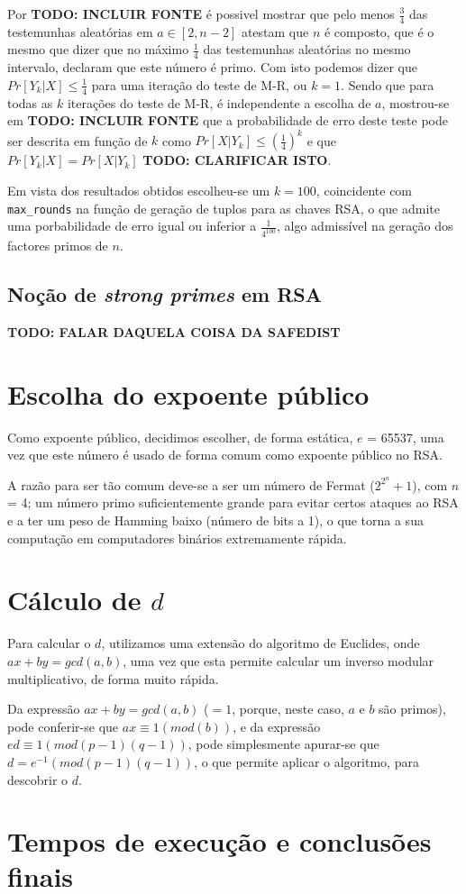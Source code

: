 \documentclass[dvipsnames]{article}
\begin{document}

\noindent Por \textbf{TODO: INCLUIR FONTE} é possivel mostrar que pelo menos $\frac{3}{4}$ das testemunhas aleatórias em $a \in [2,n-2]$ atestam que $n$ é composto, que é o mesmo que dizer que no máximo $\frac{1}{4}$ das testemunhas aleatórias no mesmo intervalo, declaram que este número é primo. Com isto podemos dizer que $Pr[Y_k|X] \leq \frac{1}{4}$ para uma iteração do teste de M-R, ou $k=1$. Sendo que para todas as $k$ iterações do teste de M-R, é independente a escolha de $a$, mostrou-se em \textbf{TODO: INCLUIR FONTE} que a probabilidade de erro deste teste pode ser descrita em função de $k$ como $Pr[X|Y_k] \leq (\frac{1}{4})^k$ e que $Pr[Y_k|X] = Pr[X|Y_k]$ \textbf{TODO: CLARIFICAR ISTO}.

\vskip 0.4cm

\noindent Em vista dos resultados obtidos escolheu-se um $k=100$, coincidente com \texttt{max\_rounds} na função de geração de tuplos para as chaves RSA, o que admite uma porbabilidade de erro igual ou inferior a $\frac{1}{4^{100}}$, algo admissível na geração dos factores primos de $n$.

\subsection{Noção de \textit{strong primes} em RSA}

\textbf{TODO: FALAR DAQUELA COISA DA SAFEDIST}

\section{Escolha do expoente público}
Como expoente público, decidimos escolher, de forma estática, $e$ =  65537, uma vez que este número é usado de forma comum como expoente público no RSA.

\vskip 0.4cm

\noindent A razão para ser tão comum deve-se a ser um número de Fermat (${2^{2^n}}+1$), com $n$ = 4; um número primo suficientemente grande para evitar certos ataques ao RSA e a ter um peso de Hamming baixo (número de bits a 1), o que torna a sua computação em computadores binários extremamente rápida.

\section{Cálculo de $d$}
Para calcular o $d$, utilizamos uma extensão do algoritmo de Euclides, onde $ax + by = gcd(a,b)$, uma vez que esta permite calcular um inverso modular multiplicativo, de forma muito rápida.

\vskip 0.4cm

\noindent Da expressão $ax + by = gcd(a,b)$ ($=1$, porque, neste caso, $a$ e $b$ são primos), pode conferir-se que $ax \equiv 1 (mod (b))$, e da expressão $ed \equiv 1 (mod (p-1)(q-1))$, pode simplesmente apurar-se que $d = e^{-1} (mod (p-1)(q-1))$, o que permite aplicar o algoritmo, para descobrir o $d$.

\section{Tempos de execução e conclusões finais}
\end{document}
